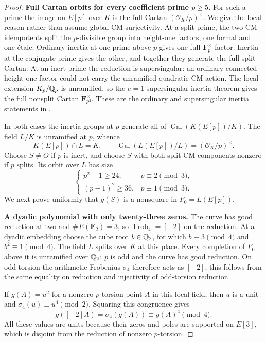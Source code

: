 \begin{proof}
\par\smallskip\noindent\textbf{Full Cartan orbits for every coefficient prime $p\ge5$.}\enspace
For such a prime the image on $E[p]$ over $K$
is the full Cartan $(\mathcal O_K/p)^\times$.
We give the local reason rather than assume
global CM surjectivity. At a split prime,
the two CM idempotents split the $p$-divisible
group into height-one factors, one formal
and one \'{e}tale. Ordinary inertia at one
prime above $p$ gives one full
$\mathbf F_p^\times$ factor. Inertia at the
conjugate prime gives the other, and together
they generate the full split Cartan.
At an inert prime the reduction is
supersingular: an ordinary connected
height-one factor could not carry the
unramified quadratic CM action.
The local extension $K_p/\mathbb Q_p$ is unramified,
so the $e=1$ supersingular inertia theorem
gives the full nonsplit Cartan
$\mathbf F_{p^2}^\times$.
These are the ordinary and supersingular
inertia statements in
\citet[Propositions 11--12, pp.~273--275]{AMSerre1972}.

In both cases the inertia groups at $p$
generate all of
$\operatorname{Gal}(K(E[p])/K)$.
The field $L/K$ is unramified at $p$, whence
\[
 K(E[p])\cap L=K,
 \qquad \operatorname{Gal}(L(E[p])/L)
           =(\mathcal O_K/p)^\times.
 \tag{A69.8}
\]
Choose $S\ne O$ if $p$ is inert, and choose
$S$ with both split CM components nonzero
if $p$ splits. Its orbit over $L$ has size
\[
 \begin{cases}
 p^2-1\ge24,&p\equiv2\pmod3,\\
 (p-1)^2\ge36,&p\equiv1\pmod3.
 \end{cases}
 \tag{A69.9}
\]
We next prove uniformly that $g(S)$ is a
nonsquare in $F_0=L(E[p])$.

\par\smallskip\noindent\textbf{A dyadic polynomial with only twenty-three zeros.}\enspace
The curve has good reduction at two and
$\#E(\mathbf F_2)=3$, so
$\operatorname{Frob}_4=[-2]$ on the reduction.
At a dyadic embedding choose the cube root
$b\in\mathbb Q_2$, for which $b\equiv3\pmod4$ and
$b^2\equiv1\pmod4$. The field $L$ splits
over $K$ at this place. Every completion of
$F_0$ above it is unramified over $\mathbb Q_2$:
$p$ is odd and the curve has good reduction.
On odd torsion the arithmetic Frobenius
$\sigma_4$ therefore acts as $[-2]$;
this follows from the same equality on
reduction and injectivity of odd-torsion
reduction.

If $g(A)=u^2$ for a nonzero $p$-torsion
point $A$ in this local field, then $u$
is a unit and $\sigma_4(u)\equiv u^4\pmod2$.
Squaring this congruence gives
\[
 g([-2]A)=\sigma_4(g(A))\equiv g(A)^4\pmod4.
 \tag{A69.10}
\]
All these values are units because their
zeros and poles are supported on $E[3]$,
which is disjoint from the reduction of
nonzero $p$-torsion.


\end{proof}
